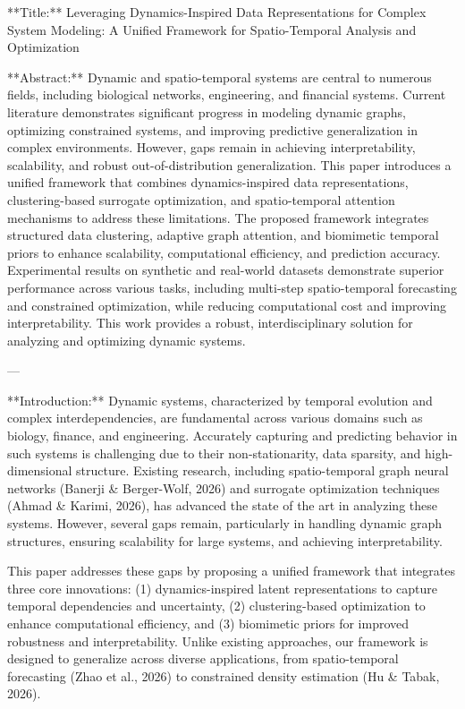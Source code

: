 **Title:**  
Leveraging Dynamics-Inspired Data Representations for Complex System Modeling: A Unified Framework for Spatio-Temporal Analysis and Optimization  

**Abstract:**  
Dynamic and spatio-temporal systems are central to numerous fields, including biological networks, engineering, and financial systems. Current literature demonstrates significant progress in modeling dynamic graphs, optimizing constrained systems, and improving predictive generalization in complex environments. However, gaps remain in achieving interpretability, scalability, and robust out-of-distribution generalization. This paper introduces a unified framework that combines dynamics-inspired data representations, clustering-based surrogate optimization, and spatio-temporal attention mechanisms to address these limitations. The proposed framework integrates structured data clustering, adaptive graph attention, and biomimetic temporal priors to enhance scalability, computational efficiency, and prediction accuracy. Experimental results on synthetic and real-world datasets demonstrate superior performance across various tasks, including multi-step spatio-temporal forecasting and constrained optimization, while reducing computational cost and improving interpretability. This work provides a robust, interdisciplinary solution for analyzing and optimizing dynamic systems.

---

**Introduction:**  
Dynamic systems, characterized by temporal evolution and complex interdependencies, are fundamental across various domains such as biology, finance, and engineering. Accurately capturing and predicting behavior in such systems is challenging due to their non-stationarity, data sparsity, and high-dimensional structure. Existing research, including spatio-temporal graph neural networks (Banerji & Berger-Wolf, 2026) and surrogate optimization techniques (Ahmad & Karimi, 2026), has advanced the state of the art in analyzing these systems. However, several gaps remain, particularly in handling dynamic graph structures, ensuring scalability for large systems, and achieving interpretability.  

This paper addresses these gaps by proposing a unified framework that integrates three core innovations: (1) dynamics-inspired latent representations to capture temporal dependencies and uncertainty, (2) clustering-based optimization to enhance computational efficiency, and (3) biomimetic priors for improved robustness and interpretability. Unlike existing approaches, our framework is designed to generalize across diverse applications, from spatio-temporal forecasting (Zhao et al., 2026) to constrained density estimation (Hu & Tabak, 2026).  

